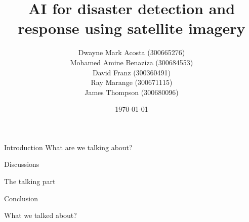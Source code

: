 \documentclass{beamer}
\title{AI for disaster detection and response using satellite imagery}
\author{Dwayne Mark Acosta (300665276) \\ Mohamed Amine Benaziza (300684553) \\ David Franz (300360491) \\ Ray Marange (300671115) \\ James Thompson (300680096)}
\date{\today}
\begin{document}
\frame{\titlepage}

\begin{frame}{Introduction}
What are we talking about?
\end{frame}

\begin{frame}{Discussions}

The talking part

\end{frame}


\begin{frame}{Conclusion}

What we talked about?
    
\end{frame}
\end{document}
